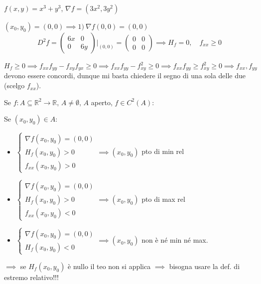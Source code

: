 \begin{example}
$f(x, y) = x^3 + y^3$, \quad $\nabla f = (3x^2, 3y^2)$

$(x_0, y_0) = (0, 0) \implies 1)\ \nabla f(0, 0) = (0, 0)$
\[
D^2 f = \begin{pmatrix} 6x & 0 \\ 0 & 6y \end{pmatrix}\Bigg|_{(0, 0)} = \begin{pmatrix} 0 & 0 \\ 0 & 0 \end{pmatrix} \implies H_f = 0, \quad f_{xx} \ge 0
\]
\end{example}

\begin{oss}
$H_f \ge 0 \implies f_{xx} f_{yy} - f_{xy} f_{yx} \ge 0 \implies f_{xx} f_{yy} - f_{xy}^2 \ge 0 \implies f_{xx} f_{yy} \ge f_{xy}^2 \ge 0 \implies f_{xx}, f_{yy}$ devono essere concordi, dunque mi basta chiedere il segno di una sola delle due (scelgo $f_{xx}$).
\end{oss}

\begin{theorem}[Cond. suff. al II° ordine ($n = 2$)]
Se $f : A \subseteq \mathbb{R}^2 \to \mathbb{R}$, $A \neq \emptyset$, $A$ aperto, $f \in C^2(A)$:

Se $(x_0, y_0) \in A$:
\begin{itemize}
    \item $\begin{cases} \nabla f(x_0, y_0) = (0, 0) \\ H_f(x_0, y_0) > 0 \\ f_{xx}(x_0, y_0) > 0 \end{cases} \implies (x_0, y_0)$ pto di min rel
    \item $\begin{cases} \nabla f(x_0, y_0) = (0, 0) \\ H_f(x_0, y_0) > 0 \\ f_{xx}(x_0, y_0) < 0 \end{cases} \implies (x_0, y_0)$ pto di max rel
    \item $\begin{cases} \nabla f(x_0, y_0) = (0, 0) \\ H_f(x_0, y_0) < 0 \end{cases} \implies (x_0, y_0)$ non è né min né max.
\end{itemize}
$\implies$ se $H_f(x_0, y_0)$ è nullo il teo non si applica $\implies$ bisogna usare la def. di estremo relativo!!!
\end{theorem}


